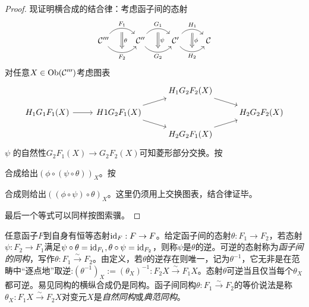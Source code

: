 \begin{Lem}
\begin{proof}
        现证明横合成的结合律：考虑函子间的态射
        \[\begin{tikzcd}
            \mathcal{C}'''
                \arrow[bend left = 50, r, "F_1", ""' name = U1]
                \arrow[bend right = 50, r, "" name = D1, "F_2"'] &
            \mathcal{C}''
                \arrow[bend left = 50, r, "G_1", ""' name = U2]
                \arrow[bend right = 50, r, "" name = D2, "G_2"'] &
            \mathcal{C}'
                \arrow[bend left = 50, r, "H_1", ""' name = U3]
                \arrow[bend right = 50, r, "" name = D3, "H_2"'] &
            \mathcal{C}
            \arrow[Rightarrow, to path = (U1)--(D1) \tikztonodes, "\theta"]
            \arrow[Rightarrow, to path = (U2)--(D2) \tikztonodes, "\psi"]
            \arrow[Rightarrow, to path = (U3)--(D3) \tikztonodes, "\phi"]
        \end{tikzcd}\]
        对任意$X\in \operatorname{Ob}(\mathcal{C}''')$考虑图表
        \[\begin{tikzcd}[row sep=small]
            & & H_1 G_2 F_2 (X)\arrow[rd] & \\
        H_1 G_1 F_1 (X)
            \arrow[r] &
        H1 G_2 F_1 (X)
            \arrow[ru]
            \arrow[rd] & &
        H_2 G_2 F_2 (X) \\
            & & H_2 G_2 F_1 (X)
                \arrow[ru] & 
        \end{tikzcd}\]
        $\psi$ 的自然性$G_2 F_1(X)\to G_2 F_2 (X)$可知菱形部分交换。按
        合成给出$(\phi \circ (\psi \circ \theta))_X$。按
        合成则给出$((\phi \circ \psi) \circ \theta)_X$。这里仍须用上交换图表，结合律证毕。

        最后一个等式可以同样按图索骥。
    \end{proof}
\end{Lem}

    任意函子$F$到自身有恒等态射$\mathrm{id}_F:F\to F$。给定函子间的态射$\theta:F_1\to F_2$，若态射$\psi:F_2 \to F_1$满足$\psi \circ \theta=\mathrm{id}_{F_1}, \theta \circ \psi = \mathrm{id}_{F_2}$，则称$\psi$是$\theta$的逆。可逆的态射称为\emph{函子间的同构}，写作$\theta:F_1 \xrightarrow{\sim} F_2$。由定义，若$\theta$的逆存在则唯一，记为$\theta^{-1}$，它无非是在范畴中“逐点地”取逆:$(\theta^{-1})_X:=(\theta_X)^{-1}:F_2X \xrightarrow{\sim}F_1X$。态射$\theta$可逆当且仅当每个$\theta_X$都可逆。易见同构的横纵合成仍是同构。函子间同构$\theta:F_1 \xrightarrow{\sim} F_2$的等价说法是称$\theta_X:F_1 X \xrightarrow{\sim}F_2 X$对变元$X$是\emph{自然同构}或\emph{典范同构}。

